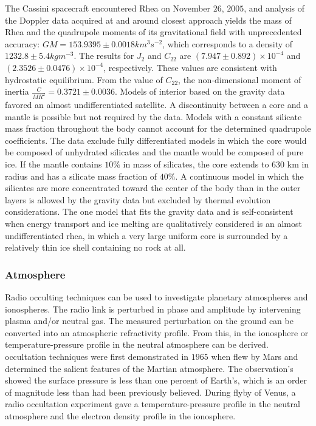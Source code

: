 \documentclass{article}
\theoremstyle{mystyle}
\begin{document}
The Cassini spacecraft encountered Rhea on November $26$, $2005$, and analysis of the Doppler data acquired at and around closest approach yields the mass of Rhea and the \gls{quadrupole} moments of its \gls{gravitational field} with unprecedented accuracy: $GM=153.9395\pm 0.0018 km^{3}s^{-2}$, which corresponds to a density of $1232.8\pm 5.4
kg m^{-3}$. The results for $J_{2}$ and $C_{22}$ are $(7.947\pm 0.892)\times 10^{-4}$ and $(2.3526\pm 0.0476)\times 10^{-4}$, respectively. These values are consistent with \gls{hydrostatic} equilibrium. From the value of $C_{22}$, the non-dimensional moment of inertia $\frac{C}{MR^{2}} = 0.3721 \pm 0.0036$. Models of  interior based on the gravity data favored an almost undifferentiated satellite. A discontinuity between a core and a mantle is possible but not required by the data. Models with a constant silicate mass fraction throughout the body cannot account for the determined \gls{quadrupole} coefficients. The data exclude fully differentiated models in which the core would be composed of unhydrated silicates and the mantle would be
composed of pure ice. If the mantle contains $10\%$ in mass of silicates, the core extends to
630 km in radius and has a silicate mass fraction of $40\%$. A continuous model in which
the silicates are more concentrated toward the center of the body than in the outer layers
is allowed by the gravity data but excluded by thermal evolution considerations. The one
model that fits the gravity data and is self-consistent when energy transport and ice
melting are qualitatively considered is an almost undifferentiated \gls{rhea}, in which a very
large uniform core is surrounded by a relatively thin ice shell containing no rock at all.

\subsubsection{Atmosphere}

Radio occulting techniques can be used to investigate planetary \glspl{atmosphere} and \glspl{ionosphere}. The radio link is perturbed in \gls{phase} and \gls{amplitude} by intervening \gls{plasma} and/or neutral gas. The measured perturbation on the ground can be converted into an atmospheric refractivity profile. From this,  in the \gls{ionosphere} or \gls{temperature-pressure profile} in the \gls{neutral atmosphere} can be derived. \Gls{occultation} techniques were first demonstrated in $1965$ when  flew by Mars and determined the salient features of the Martian \gls{atmosphere}. The observation's showed the surface pressure is less than one percent of Earth's, which is an order of magnitude less than had been previously believed. During  flyby of Venus, a radio \gls{occultation} experiment gave a \gls{temperature-pressure profile} in the \gls{neutral atmosphere} and the \gls{electron density profile} in the ionosphere. 
\end{document}
